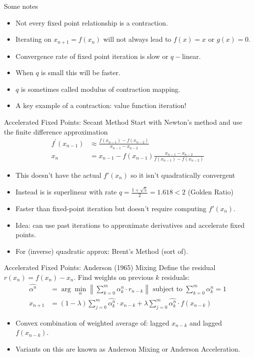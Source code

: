 \documentclass[xcolor=pdftex,dvipsnames,table,mathserif,aspectratio=169]{beamer}
\begin{document}
\begin{frame}{Some notes}
\begin{itemize}
\item Not every fixed point relationship is a contraction.
\item Iterating on $x_{n+1} = f(x_n)$ will not always lead to $f(x) = x$ or $g(x) =0$.
\item Convergence rate of fixed point iteration is \alert{slow} or $q-$linear.
\item When $q$ is small this will be faster.
\item $q$ is sometimes called \alert{modulus} of contraction mapping.
\item A key example of a contraction: \alert{value function iteration}!
\end{itemize}
\end{frame}

\begin{frame}{Accelerated Fixed Points: Secant Method}
Start with Newton's method and use the finite difference approximation
\begin{align*}
f^{\prime}\left(x_{n-1}\right)  &\approx \frac{f\left(x_{n-1}\right)-f\left(x_{n-2}\right)}{x_{n-1}-x_{n-2}} \\
x_{n}&=x_{n-1}-f\left(x_{n-1}\right) \frac{x_{n-1}-x_{n-2}}{f\left(x_{n-1}\right)-f\left(x_{n-2}\right)}
\end{align*}
\begin{itemize}
\item This doesn't have the actual $f'(x_n)$ so it isn't quadratically convergent
\item Instead is is superlinear with rate $q = \frac{1 + \sqrt{5}}{2}=1.618 < 2$ (Golden Ratio)
\item Faster than fixed-point iteration but doesn't require computing $f'(x_n)$.
\item Idea: can use past iterations to approximate derivatives and accelerate fixed points.
\item For (inverse) quadratic approx: \alert{Brent's Method} (sort of).
\end{itemize}
\end{frame}

\begin{frame}{Accelerated Fixed Points: Anderson (1965) Mixing}
Define the residual $r(x_n) = f(x_n) - x_n$. Find weights on previous $k$ residuals:
\begin{align*}
\widehat{\alpha^{n}} &= \arg \min_{\alpha} \left\|\sum_{k=0}^{m} \alpha_{k}^{n} \cdot r_{n-k}\right\| \text { subject to } \sum_{k=0}^{m} \alpha_{k}^{n}=1\\
x_{n+1}&=\left(1-\lambda\right) \sum_{j=0}^{m} \widehat{\alpha_{k}^{n}}\cdot x_{n-k}+\lambda \sum_{j=0}^{m}\widehat{\alpha_{k}^{n}}\cdot f\left(x_{n-k}\right)
\end{align*}
\begin{itemize}
\item Convex combination of weighted average of: lagged $x_{n-k}$ and lagged $f(x_{n-k})$.
\item Variants on this are known as \alert{Anderson Mixing} or \alert{Anderson Acceleration}.
\end{itemize}
\end{frame}
\end{document}
